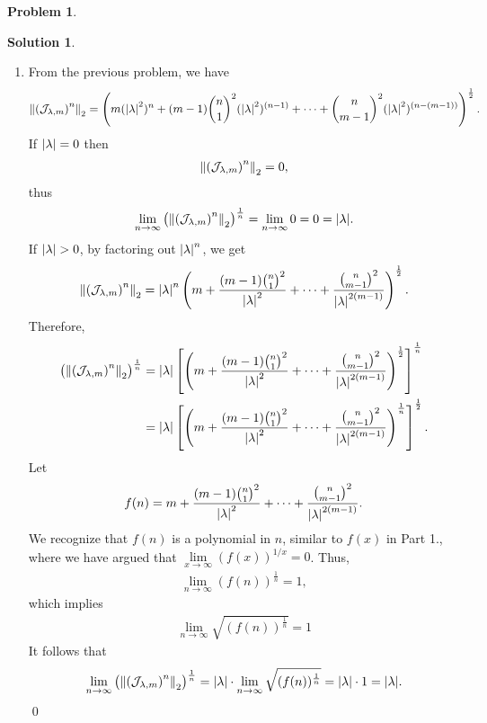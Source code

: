 \documentclass{article}
\theoremstyle{definition}
\newtheorem*{prob*}{Problem}
\newtheorem*{sln*}{Solution}
\newcommand{\jor}{\mathcal{J}}
\begin{document}
\begin{prob*}
\begin{sln*}
\begin{enumerate}
			
			\newpage
			
			
			\item From the previous problem, we have
			\begin{align*}
			\norm{\left(\jor_{\lambda,m}\right)^n}_2 = \left( m(\abs{\lambda}^{2})^n  + (m-1){n\choose 1}^2(\abs{\lambda}^{2})^{(n-1)} + \dots + {n\choose m-1}^2(\abs{  \lambda}^{2})^{(n-(m-1))}  \right)^\frac{1}{2}.
			\end{align*}
			If $\abs{\lambda} = 0$ then 
			\begin{align*}
			\norm{\left(\jor_{\lambda,m}\right)^n}_2 = 0,
			\end{align*}
			thus 
			\begin{align*}
			\lim\limits_{n\to\infty} \left(\norm{\left(\jor_{\lambda,m}\right)^n}_2\right)^{\frac{1}{n}} = \lim\limits_{n\to\infty} 0  = 0= \abs{\lambda}.
			\end{align*}
			If $\abs{\lambda} > 0$, by factoring out $\abs{\lambda}^n$, we get
			\begin{align*}
			\norm{\left(\jor_{\lambda,m}\right)^n}_2 = \abs{\lambda}^n \left( m  + \frac{(m-1){n\choose 1}^2}{\abs{\lambda}^2} + \dots + \frac{{n\choose m-1}^2}{\abs{\lambda}^{2(m-1)}}  \right)^\frac{1}{2}.
			\end{align*}
			Therefore,
			\begin{align*}
			\left(  \norm{\left(\jor_{\lambda,m}\right)^n}_2 \right)^{\frac{1}{n}} &= \abs{\lambda}\left[\left( m  + \frac{(m-1){n\choose 1}^2}{\abs{\lambda}^2} + \dots + \frac{{n\choose m-1}^2}{\abs{\lambda}^{2(m-1)}}  \right)^\frac{1}{2}\right]^{\frac{1}{n}}\\
			&= \abs{\lambda}\left[\left( m + \frac{(m-1){n\choose 1}^2}{\abs{\lambda}^2} + \dots + \frac{{n\choose m-1}^2}{\abs{\lambda}^{2(m-1)}}  \right)^\frac{1}{n}\right]^{\frac{1}{2}}.
			\end{align*}
			Let
			\begin{align*}
			f(n) = m  + \frac{(m-1){n\choose 1}^2}{\abs{\lambda}^2} + \dots + \frac{{n\choose m-1}^2}{\abs{\lambda}^{2(m-1)}}.
			\end{align*}
			We recognize that $f(n)$ is a polynomial in $n$, similar to $f(x)$ in Part 1., where we have argued that $\lim\limits_{x\to\infty} (f(x))^{1/x} = 0$. Thus, 
			\begin{align*}
			\lim\limits_{n\to\infty} (f(n))^{\frac{1}{n}} = 1,
			\end{align*}
			which implies
			\begin{align*}
			\lim\limits_{n\to\infty} \sqrt{(f(n))^{\frac{1}{n}}} = 1
			\end{align*}
			It follows that 
			\begin{align*}
			\lim\limits_{n\to\infty} \left(  \norm{\left(\jor_{\lambda,m}\right)^n}_2 \right)^{\frac{1}{n}} = \abs{\lambda}\cdot\lim\limits_{n\to\infty}\sqrt{(f(n))^{\frac{1}{n}}} = \abs{\lambda}\cdot 1 = \abs{\lambda}.
			\end{align*}\qed
		\end{enumerate}
	\end{sln*}
	
\end{prob*}
\end{document}
